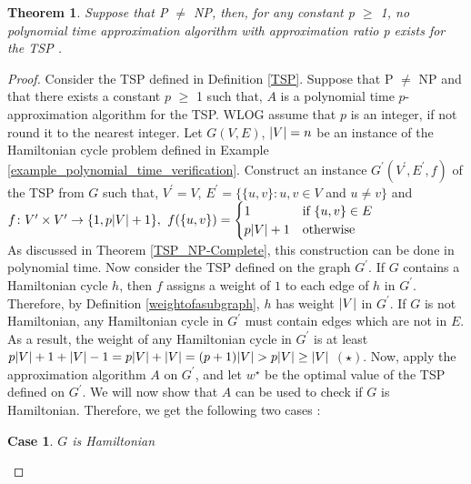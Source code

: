 \documentclass[12pt]{article}
\newtheorem{theorem}[definition]{Theorem}
\newtheorem{case}{Case}
\numberwithin{equation}{subsection}
\numberwithin{table}{subsection}
\begin{document}
\begin{theorem}
Suppose that P $\neq$ NP, then, for any constant p $\geq$ 1, no polynomial time approximation algorithm with approximation ratio p exists for the TSP {}.
\label{no_approx_tsp}
\end{theorem}
\begin{proof}
Consider the TSP defined in Definition \ref{TSP}. Suppose that P $\neq$ NP and that there exists a constant $p$ $\geq$ 1 such that, $A$ is a polynomial time $p$-approximation algorithm for the TSP. WLOG assume that $p$ is an integer, if not round it to the nearest integer. Let $G(V,E)$, $\abs{V} = n$ be an instance of the Hamiltonian cycle problem defined in Example \ref{example_polynomial_time_verification}. Construct an instance $G^\prime(V^\prime,E^\prime,f)$ of the TSP from $G$ such that, $V^\prime = V$, $E^\prime = \{ \{u, v\} : u, v \in V$ and $u \neq v\}$ and \\ 
$f\colon V^\prime \times V^\prime \to \{1, p\abs{V} + 1\},$ $f(\{u, v\}) = \begin{cases} 1& \text{if } \{u, v\} \in E\\ p\abs{V} + 1              & \text{otherwise} \end{cases}$\\
As discussed in Theorem \ref{TSP_NP-Complete}, this construction can be done in polynomial time. Now consider the TSP defined on the graph $G^\prime$. If $G$ contains a Hamiltonian cycle $h$, then $f$ assigns a weight of $1$ to each edge of $h$ in $G^\prime$. Therefore, by Definition \ref{weightofasubgraph}, $h$ has weight $\abs{V}$ in $G^\prime$. If $G$ is not Hamiltonian, any Hamiltonian cycle in $G^\prime$ must contain edges which are not in $E$. As a result, the weight of any Hamiltonian cycle in $G^\prime$ is at least $p\abs{V} + 1 + \abs{V} - 1 = p\abs{V} + \abs{V} = (p+1)\abs{V} > p\abs{V} \geq \abs{V}$ $(\star)$.  Now, apply the approximation algorithm $A$ on $G^\prime$, and let $w^\star$ be the optimal value of the TSP defined on $G^\prime$. We will now show that $A$ can be used to check if $G$ is Hamiltonian. Therefore, we get the following two cases : 
\begin{case}
\label{case1}
$G$ is Hamiltonian 
\end{case}

\end{proof}
\end{document}
